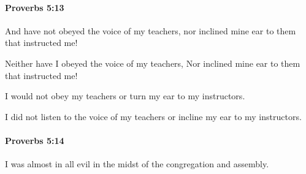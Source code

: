 		\paragraph{Proverbs 5:13} %
			\label{PROVERBS-5-13}

			And have not obeyed the voice of my teachers, nor inclined mine ear to them that instructed me!

			\begin{versebox}
					\item[BHS] 
					\item[ASV] Neither have I obeyed the voice of my teachers, Nor inclined mine ear to them that instructed me!
					\item[NIV] I would not obey my teachers or turn my ear to my instructors.
					\item[NRSV] I did not listen to the voice of my teachers or incline my ear to my instructors.
			\end{versebox}

		\paragraph{Proverbs 5:14} %
			\label{PROVERBS-5-14}

			I was almost in all evil in the midst of the congregation and assembly.

